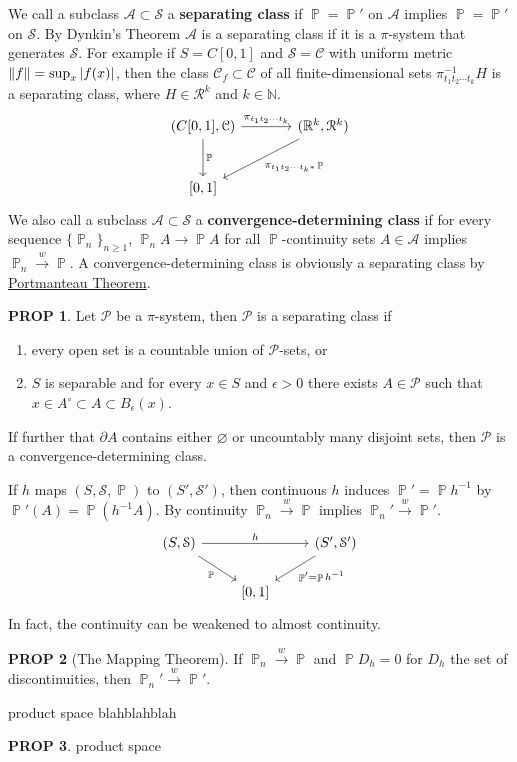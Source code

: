 \documentclass[hidelinks,11pt]{article}
\theoremstyle{definition}
\theoremstyle{dotless}
\newtheorem{prop}{PROP}[section]
\theoremstyle{remark}
\DeclareMathOperator{\1}{\mathbf{1}}
\DeclareMathOperator{\p}{\mathbb{P}}
\begin{document}
We call a subclass $\mathcal{A}\subset\mathcal{S}$ a \textbf{separating class} if $\p=\p'$ on $\mathcal{A}$ implies $\p=\p'$ on $\mathcal{S}$. By Dynkin's Theorem $\mathcal{A}$ is a separating class if it is a $\pi$-system that generates $\mathcal{S}$. For example if $S=C[0,1]$ and $\mathcal{S}=\mathcal{C}$ with uniform metric $\norm{f}=\sup_x\abs{f(x)}$, then the class $\mathcal{C}_f\subset\mathcal{C}$ of all finite-dimensional sets $\pi_{t_1t_2\cdots t_k}^{-1}H$ is a separating class, where $H\in\mathcal{R}^k$ and $k\in\mathbb{N}$.
\[\begin{tikzcd}[row sep=large,column sep=large]
{(C[0,1],\mathcal{C})}\arrow[d,"\p"]\arrow[r,"\pi_{t_1t_2\cdots t_k}"]&{(\mathbb{R}^k,\mathcal{R}^k)}\arrow[ld,"\pi_{t_1t_2\cdots t_k\ast}\p"]\\
{[0,1]}&            
\end{tikzcd}\]
We also call a subclass $\mathcal{A}\subset\mathcal{S}$ a \textbf{convergence-determining class} if for every sequence $\{\p_n\}_{n\geq1}$, $\p_nA\to\p A$ for all $\p$-continuity sets $A\in\mathcal{A}$ implies $\p_n\xrightarrow{w}\p$. A convergence-determining class is obviously a separating class by \hyperref[Portmanteau Theorem]{Portmanteau Theorem}.
\begin{prop}
Let $\mathcal{P}$ be a $\pi$-system, then $\mathcal{P}$ is a separating class if
\begin{enumerate}[label=\textup{(\roman*)}]
    \item every open set is a countable union of $\mathcal{P}$-sets, or
    \item $S$ is separable and for every $x\in S$ and $\epsilon>0$ there exists $A\in\mathcal{P}$ such that $x\in A^\circ\subset A\subset B_\epsilon(x)$.
\end{enumerate}
If further that $\partial A$ contains either $\varnothing$ or uncountably many disjoint sets, then $\mathcal{P}$ is a convergence-determining class.
\end{prop}
If $h$ maps $(S,\mathcal{S},\p)$ to $(S',\mathcal{S}')$, then continuous $h$ induces $\p'=\p h^{-1}$ by $\p'(A)=\p(h^{-1}A)$. By continuity $\p_n\xrightarrow{w}\p$ implies $\p_n'\xrightarrow{w}\p'$.
\[\begin{tikzcd}
{(S,\mathcal{S})}\arrow[dr,"\p"']\arrow[rr,"h"]&&{(S',\mathcal{S}')}\arrow[dl,"\p'=\p h^{-1}"]\\
&{[0,1]}
\end{tikzcd}\]
In fact, the continuity can be weakened to almost continuity.
\begin{prop}[The Mapping Theorem]
If $\p_n\xrightarrow{w}\p$ and $\p D_h=0$ for $D_h$ the set of discontinuities, then $\p_n'\xrightarrow{w}\p'$.
\end{prop}
product space blahblahblah
\begin{prop}
product space
\end{prop}
\end{document}
